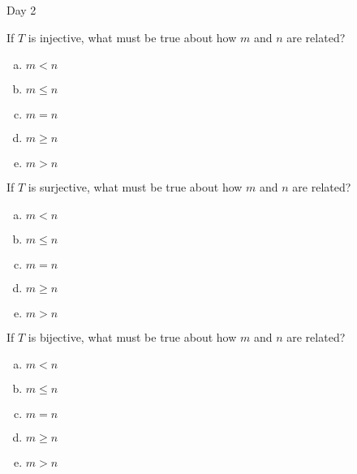 \begin{applicationActivities}{Day 2}
\begin{activity}
If $T$ is injective, what must be true about how $m$ and $n$ are related?
\begin{enumerate}[(a)]
\item $m<n$
\item $m \leq n$
\item $m=n$
\item $m \geq n$
\item $m>n$
\end{enumerate}
\end{activity}

\begin{activity}
If $T$ is surjective, what must be true about how $m$ and $n$ are related?
\begin{enumerate}[(a)]
\item $m<n$
\item $m \leq n$
\item $m=n$
\item $m \geq n$
\item $m>n$
\end{enumerate}
\end{activity}

\begin{activity}
  If $T$ is bijective, what must be true about how $m$ and $n$ are related?
\begin{enumerate}[(a)]
\item $m<n$
\item $m \leq n$
\item $m=n$
\item $m \geq n$
\item $m>n$
\end{enumerate}
\end{activity}

\end{applicationActivities}
